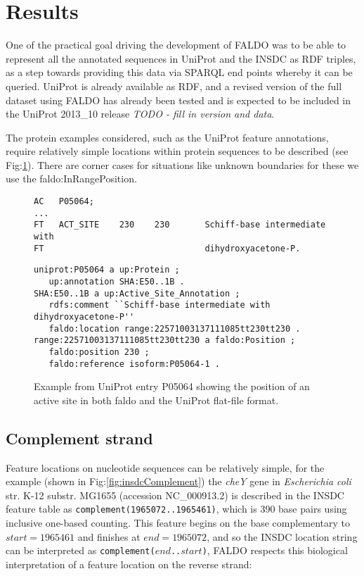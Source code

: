\section*{Results}
One of the practical goal driving the development of FALDO was to be able
to represent all the annotated sequences in UniProt and the INSDC as RDF
triples, as a step towards providing this data via SPARQL end points whereby
it can be queried.
UniProt is already available as RDF, and a revised version of the full
dataset using FALDO has already been tested and is expected to be included
in the UniProt 2013\_10 release \textit{TODO - fill in version and data}.

The protein examples considered, such as the UniProt feature annotations,
require relatively simple locations within protein sequences to be described (see Fig:\ref{fig:UniProt}).
There are corner cases for situations like unknown boundaries for these we use the faldo:InRangePosition.

\begin{figure}
\begin{verbatim}
AC   P05064;
...
FT   ACT_SITE    230    230       Schiff-base intermediate with
FT                                dihydroxyacetone-P.
\end{verbatim}
\begin{verbatim}
uniprot:P05064 a up:Protein ;
   up:annotation SHA:E50..1B .
SHA:E50..1B a up:Active_Site_Annotation ;
   rdfs:comment ``Schiff-base intermediate with dihydroxyacetone-P''
   faldo:location range:22571003137111085tt230tt230 .
range:22571003137111085tt230tt230 a faldo:Position ;
   faldo:position 230 ;
   faldo:reference isoform:P05064-1 .
\end{verbatim}
\caption{Example from UniProt entry P05064 showing the position of an active site in both faldo and the UniProt flat-file format.}
\label{fig:UniProt}
\end{figure}
\subsection*{Complement strand}
Feature locations on nucleotide sequences can be relatively simple,
for the example (shown in Fig:\ref{fig:insdcComplement}) the \textit{cheY} gene in
\textit{Escherichia coli} str. K-12 substr. MG1655 (accession NC\_000913.2)
is described in the INSDC feature table as \texttt{complement(1965072..1965461)},
which is 390 base pairs using inclusive one-based counting.
This feature begins on the base complementary to $start = 1965461$
and finishes at $end = 1965072$, and so the INSDC location string
can be interpreted as \texttt{complement($end$..$start$)},
FALDO respects this biological interpretation of a feature location
on the reverse strand:

